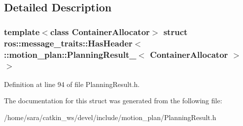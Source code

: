 \subsection{Detailed Description}
\subsubsection*{template$<$class Container\+Allocator$>$\newline
struct ros\+::message\+\_\+traits\+::\+Has\+Header$<$ \+::motion\+\_\+plan\+::\+Planning\+Result\+\_\+$<$ Container\+Allocator $>$ $>$}



Definition at line 94 of file Planning\+Result.\+h.



The documentation for this struct was generated from the following file\+:\begin{DoxyCompactItemize}
\item 
/home/sara/catkin\+\_\+ws/devel/include/motion\+\_\+plan/Planning\+Result.\+h\end{DoxyCompactItemize}
